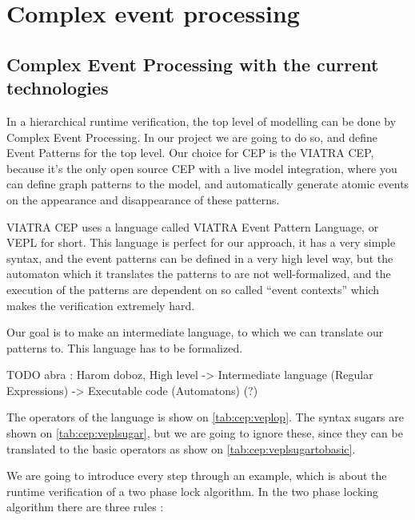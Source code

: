 \chapter{Complex event processing}
	\label{chap:cep}
	\section{Complex Event Processing with the current technologies}
		In a hierarchical runtime verification, the top level of modelling can be done by Complex Event Processing.
		In our project we are going to do so, and define Event Patterns for the top level.
		Our choice for CEP is the VIATRA CEP, because it's the only open source CEP with 
		a live model integration, where you can define graph patterns to the model, and automatically generate atomic events
		on the appearance and disappearance of these patterns.
		
		VIATRA CEP uses a language called VIATRA Event Pattern Language, or VEPL for short.
		This language is perfect for our approach, it has a very simple syntax, and the event patterns can be defined in
		a very high level way, but the automaton which it translates the patterns to are not well-formalized, and the
		execution of the patterns are dependent on so called ``event contexts'' which makes the verification extremely hard.
		
		Our goal is to make an intermediate language, to which we can translate our patterns to. This language has to be 
		formalized.
		
		TODO abra : Harom doboz, High level -> Intermediate language (Regular Expressions) -> Executable code (Automatons) (?) 

		The operators of the language is show on \cref{tab:cep:veplop}. 
		The syntax sugars are shown on \cref{tab:cep:veplsugar},
		but we are going to ignore these, since they can be translated to the basic operators as show on \cref{tab:cep:veplsugartobasic}.
		
		We are going to introduce every step through an example, which is about the runtime verification of a two phase lock algorithm.
		In the two phase locking algorithm there are three rules :
		
		
		
			
